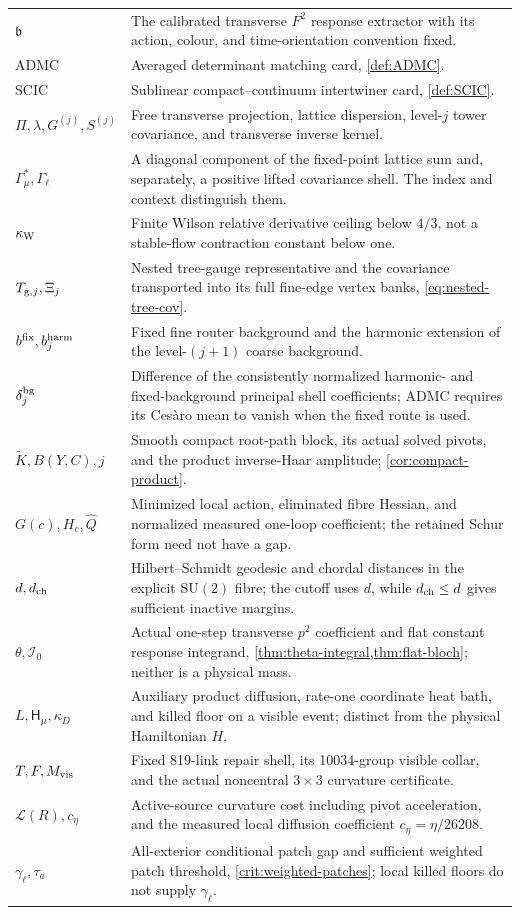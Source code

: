 \documentclass[11pt,oneside,openany]{book}
\theoremstyle{definition}
\theoremstyle{remark}
\newcommand{\SU}{\mathrm{SU}}
\begin{document}
\begin{longtable}{L{0.23\textwidth}L{0.70\textwidth}}
$\mathfrak b$ & The calibrated transverse $F^2$ response extractor with its action, colour, and time-orientation convention fixed. \\
ADMC & Averaged determinant matching card, \cref{def:ADMC}. \\
SCIC & Sublinear compact--continuum intertwiner card, \cref{def:SCIC}. \\
$\Pi,\lambda,G^{(j)},S^{(j)}$ & Free transverse projection, lattice dispersion, level-$j$ tower covariance, and transverse inverse kernel. \\
$\Gamma_\mu^*,\Gamma_\ell$ & A diagonal component of the fixed-point lattice sum and, separately, a positive lifted covariance shell. The index and context distinguish them. \\
$\kappa_{\rm W}$ & Finite Wilson relative derivative ceiling below $4/3$, not a stable-flow contraction constant below one. \\
$T_{{\rm g},j},\Xi_j$ & Nested tree-gauge representative and the covariance transported into its full fine-edge vertex banks, \cref{eq:nested-tree-cov}. \\
$b^{\rm fix},b_j^{\rm harm}$ & Fixed fine router background and the harmonic extension of the level-$(j+1)$ coarse background. \\
$\delta_j^{\rm bg}$ & Difference of the consistently normalized harmonic- and fixed-background principal shell coefficients; ADMC requires its Ces\`aro mean to vanish when the fixed route is used. \\
$\widetilde K,B(Y,C),j$ & Smooth compact root-path block, its actual solved pivots, and the product inverse-Haar amplitude; \cref{cor:compact-product}. \\
$G(c),H_c,\widehat Q$ & Minimized local action, eliminated fibre Hessian, and normalized measured one-loop coefficient; the retained Schur form need not have a gap. \\
$d,d_{\rm ch}$ & Hilbert--Schmidt geodesic and chordal distances in the explicit $\SU(2)$ fibre; the cutoff uses $d$, while $d_{\rm ch}\le d$ gives sufficient inactive margins. \\
$\theta,\mathcal I_0$ & Actual one-step transverse $p^2$ coefficient and flat constant response integrand, \cref{thm:theta-integral,thm:flat-bloch}; neither is a physical mass. \\
$L,\mathsf H_\mu,\kappa_D$ & Auxiliary product diffusion, rate-one coordinate heat bath, and killed floor on a visible event; distinct from the physical Hamiltonian $H$. \\
$T,F,M_{\rm vis}$ & Fixed 819-link repair shell, its 10034-group visible collar, and the actual noncentral $3\times3$ curvature certificate. \\
$\mathcal L(R),c_\eta$ & Active-source curvature cost including pivot acceleration, and the measured local diffusion coefficient $c_\eta=\eta/26208$. \\
$\gamma_\ell,\tau_a$ & All-exterior conditional patch gap and sufficient weighted patch threshold, \cref{crit:weighted-patches}; local killed floors do not supply $\gamma_\ell$. \\
\bottomrule
\end{longtable}
\end{document}
